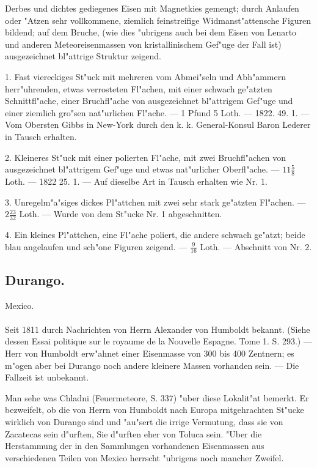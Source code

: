 \documentclass[a4paper, 11pt, oneside, polutonikogreek, german]{article}
\begin{document}
Derbes und dichtes gediegenes Eisen mit Magnetkies gemengt; durch Anlaufen oder "Atzen sehr vollkommene, ziemlich feinstreifige Widmanst"attensche Figuren bildend; auf dem Bruche, (wie dies "ubrigens auch bei dem Eisen von Lenarto und anderen Meteoreisenmassen von kristallinischem Gef"uge der Fall ist) ausgezeichnet bl"attrige Struktur zeigend.

1. Fast viereckiges St"uck mit mehreren vom Abmei"seln und Abh"ammern herr"uhrenden, etwas verrosteten Fl"achen, mit einer schwach ge"atzten Schnittfl"ache, einer Bruchfl"ache von ausgezeichnet bl"attrigem Gef"uge und einer ziemlich gro"sen nat"urlichen Fl"ache. --- 1 Pfund 5 Loth. --- 1822. 49. 1. --- Vom Obersten Gibbs in New-York durch den k. k. General-Konsul Baron Lederer in Tausch erhalten.

2. Kleineres St"uck mit einer polierten Fl"ache, mit zwei Bruchfl"achen von ausgezeichnet bl"attrigem Gef"uge und etwas nat"urlicher Oberfl"ache. --- $11\frac{5}{8}$ Loth. --- 1822 25. 1. --- Auf dieselbe Art in Tausch erhalten wie Nr. 1.

3. Unregelm"a"siges dickes Pl"attchen mit zwei sehr stark ge"atzten Fl"achen. --- $2\frac{23}{32}$ Loth. --- Wurde von dem St"ucke Nr. 1 abgeschnitten.

4. Ein kleines Pl"attchen, eine Fl"ache poliert, die andere schwach ge"atzt; beide blau angelaufen und sch"one Figuren zeigend. --- $\frac{9}{16}$ Loth. --- Abschnitt von Nr. 2.
\subsection{Durango.}
\begin{center}
\small
Mexico.
\end{center}
\paragraph{}
Seit 1811 durch Nachrichten von Herrn Alexander von Humboldt bekannt. (Siehe dessen Essai politique sur le royaume de la Nouvelle Espagne. Tome 1. S. 293.) --- Herr von Humboldt erw"ahnet einer Eisenmasse von 300 bis 400 Zentnern; es m"ogen aber bei Durango noch andere kleinere Massen vorhanden sein. --- Die Fallzeit ist unbekannt.

Man sehe was Chladni (Feuermeteore, S. 337) "uber diese Lokalit"at bemerkt. Er bezweifelt, ob die von Herrn von Humboldt nach Europa mitgehrachten St"ucke wirklich von Durango sind und "au"sert die irrige Vermutung, dass sie von Zacatecas sein d"urften, Sie d"urften eher von Toluca sein. "Uber die Herstammung der in den Sammlungen vorhandenen Eisenmassen aus verschiedenen Teilen von Mexico herrscht "ubrigens noch mancher Zweifel.
\end{document}

